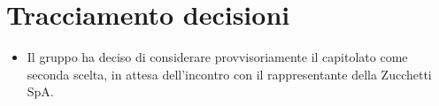 \section{Tracciamento decisioni}
\begin{itemize}
    \item Il gruppo ha deciso di considerare provvisoriamente il capitolato come seconda scelta, in attesa dell'incontro con il rappresentante della Zucchetti SpA.
\end{itemize}
